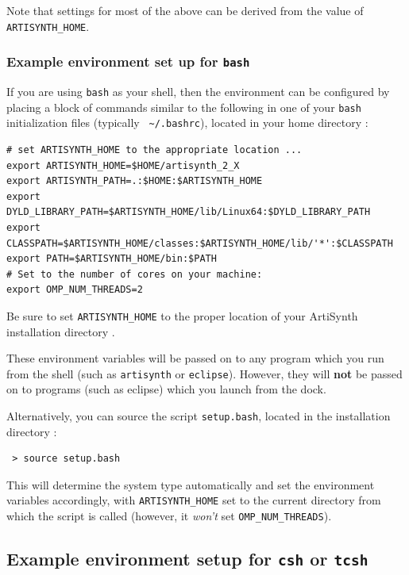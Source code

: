 \documentclass{article}
\def\directory{directory }
\begin{document}

Note that settings for most of the above can be derived from the value
of {\tt ARTISYNTH\_HOME}.

\subsubsection{Example environment set up for {\tt bash}}
\label{BashEnvironmentSetup}

If you are using {\tt bash} as your shell, then the environment can be
configured by placing a block of commands similar to the following in
one of your {\tt bash} initialization files (typically {\tt
\textasciitilde/.bashrc}), located in your home \directory:

\begin{lstlisting}
# set ARTISYNTH_HOME to the appropriate location ...
export ARTISYNTH_HOME=$HOME/artisynth_2_X
export ARTISYNTH_PATH=.:$HOME:$ARTISYNTH_HOME
export DYLD_LIBRARY_PATH=$ARTISYNTH_HOME/lib/Linux64:$DYLD_LIBRARY_PATH
export CLASSPATH=$ARTISYNTH_HOME/classes:$ARTISYNTH_HOME/lib/'*':$CLASSPATH
export PATH=$ARTISYNTH_HOME/bin:$PATH
# Set to the number of cores on your machine:
export OMP_NUM_THREADS=2 
\end{lstlisting}

Be sure to set {\tt ARTISYNTH\_HOME} to the proper location of your
ArtiSynth installation \directory.

These environment variables will be passed on to any program which you
run from the shell (such as {\tt artisynth} or {\tt eclipse}).
However, they will {\bf not} be passed on to programs (such as eclipse)
which you launch from the dock.

Alternatively, you can source the script {\tt setup.bash}, located in
the installation \directory:

\begin{verbatim}
 > source setup.bash
\end{verbatim}

This will determine the system type automatically and set the
environment variables accordingly, with {\tt ARTISYNTH\_HOME} set to the
current \directory from which the script is called (however,
it {\it won't} set {\tt OMP\_NUM\_THREADS}).

\subsection{Example environment setup for {\tt csh} or {\tt tcsh}}
\label{CshEnvironmentSetup}
\end{document}
